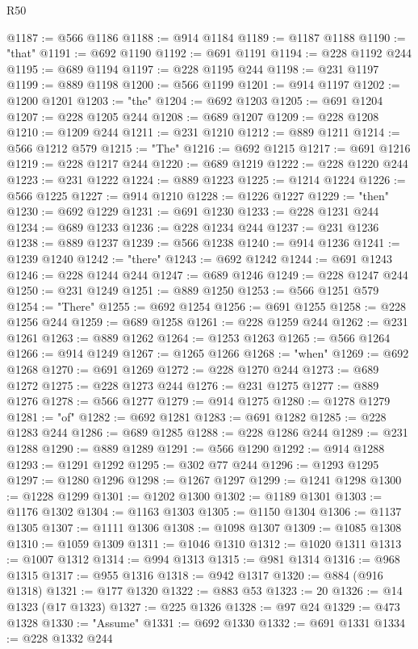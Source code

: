 \begin{lexlean}{R50}
\begin{coremodule}
@1187 := @566 @1186
@1188 := @914 @1184
@1189 := @1187 @1188
@1190 := "that"
@1191 := @692 @1190
@1192 := @691 @1191
@1194 := @228 @1192 @244
@1195 := @689 @1194
@1197 := @228 @1195 @244
@1198 := @231 @1197
@1199 := @889 @1198
@1200 := @566 @1199
@1201 := @914 @1197
@1202 := @1200 @1201
@1203 := "the"
@1204 := @692 @1203
@1205 := @691 @1204
@1207 := @228 @1205 @244
@1208 := @689 @1207
@1209 := @228 @1208
@1210 := @1209 @244
@1211 := @231 @1210
@1212 := @889 @1211
@1214 := @566 @1212 @579
@1215 := "The"
@1216 := @692 @1215
@1217 := @691 @1216
@1219 := @228 @1217 @244
@1220 := @689 @1219
@1222 := @228 @1220 @244
@1223 := @231 @1222
@1224 := @889 @1223
@1225 := @1214 @1224
@1226 := @566 @1225
@1227 := @914 @1210
@1228 := @1226 @1227
@1229 := "then"
@1230 := @692 @1229
@1231 := @691 @1230
@1233 := @228 @1231 @244
@1234 := @689 @1233
@1236 := @228 @1234 @244
@1237 := @231 @1236
@1238 := @889 @1237
@1239 := @566 @1238
@1240 := @914 @1236
@1241 := @1239 @1240
@1242 := "there"
@1243 := @692 @1242
@1244 := @691 @1243
@1246 := @228 @1244 @244
@1247 := @689 @1246
@1249 := @228 @1247 @244
@1250 := @231 @1249
@1251 := @889 @1250
@1253 := @566 @1251 @579
@1254 := "There"
@1255 := @692 @1254
@1256 := @691 @1255
@1258 := @228 @1256 @244
@1259 := @689 @1258
@1261 := @228 @1259 @244
@1262 := @231 @1261
@1263 := @889 @1262
@1264 := @1253 @1263
@1265 := @566 @1264
@1266 := @914 @1249
@1267 := @1265 @1266
@1268 := "when"
@1269 := @692 @1268
@1270 := @691 @1269
@1272 := @228 @1270 @244
@1273 := @689 @1272
@1275 := @228 @1273 @244
@1276 := @231 @1275
@1277 := @889 @1276
@1278 := @566 @1277
@1279 := @914 @1275
@1280 := @1278 @1279
@1281 := "of"
@1282 := @692 @1281
@1283 := @691 @1282
@1285 := @228 @1283 @244
@1286 := @689 @1285
@1288 := @228 @1286 @244
@1289 := @231 @1288
@1290 := @889 @1289
@1291 := @566 @1290
@1292 := @914 @1288
@1293 := @1291 @1292
@1295 := @302 @77 @244
@1296 := @1293 @1295
@1297 := @1280 @1296
@1298 := @1267 @1297
@1299 := @1241 @1298
@1300 := @1228 @1299
@1301 := @1202 @1300
@1302 := @1189 @1301
@1303 := @1176 @1302
@1304 := @1163 @1303
@1305 := @1150 @1304
@1306 := @1137 @1305
@1307 := @1111 @1306
@1308 := @1098 @1307
@1309 := @1085 @1308
@1310 := @1059 @1309
@1311 := @1046 @1310
@1312 := @1020 @1311
@1313 := @1007 @1312
@1314 := @994 @1313
@1315 := @981 @1314
@1316 := @968 @1315
@1317 := @955 @1316
@1318 := @942 @1317
@1320 := @884 (@916 @1318)
@1321 := @177 @1320
@1322 := @883 @53
@1323 := 20
@1326 := @14 @1323 (@17 @1323)
@1327 := @225 @1326
@1328 := @97 @24
@1329 := @473 @1328
@1330 := "Assume"
@1331 := @692 @1330
@1332 := @691 @1331
@1334 := @228 @1332 @244

\end{coremodule}
\end{lexlean}
